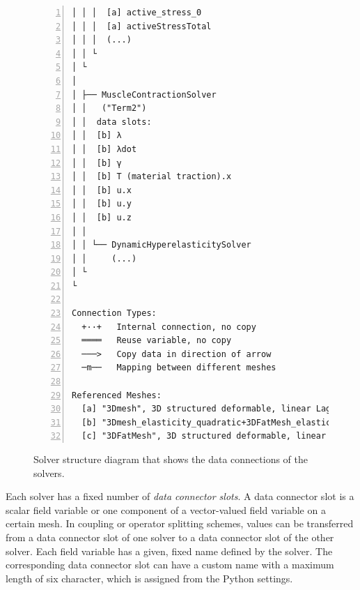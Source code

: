 \begin{figure}
\begin{framed}
\begin{Verbatim}[fontsize=\scriptsize\ttfamily,numbers=left]
│ │ │  [a] active_stress_0                          ├÷÷÷÷÷÷÷÷─ g_mu ¤2<──┘     │ │
│ │ │  [a] activeStressTotal                         ├÷÷÷÷÷÷÷ g_tot ¤3  x      │ │
│ │ │  (...)                                          :::::::                  m │
│ │ └                                                 :::::::                  │ │
│ └                                                   :::::::                  │ │
│                                                     :::::::                  │ │
│ ├── MuscleContractionSolver                         :::::::                  │ │ 
│ │   ("Term2")                                       :::::::                  │ │
│ │  data slots:                                      :::::::                  │ │
│ │  [b] λ                                            ├÷÷÷÷÷÷lambda ¤0<────────┼─┘
│ │  [b] λdot                                          ├÷÷÷÷÷─ ldot ¤1  x      │
│ │  [b] γ                                              ├÷÷÷÷─ g_in ¤2<────────┘
│ │  [b] T (material traction).x                         ├÷÷÷──── T ¤3  x
│ │  [b] u.x                                              ├÷÷────── ¤4  x
│ │  [b] u.y                                               ├÷────── ¤5  x
│ │  [b] u.z                                                ├────── ¤6  x
│ │                                                                     
│ │ └── DynamicHyperelasticitySolver    
│ │     (...)                                
│ └                                                                     
└                                                                       
                                                                        
Connection Types:
  +··+   Internal connection, no copy
  ════   Reuse variable, no copy
  ───>   Copy data in direction of arrow
  ─m──   Mapping between different meshes

Referenced Meshes:
  [a] "3Dmesh", 3D structured deformable, linear Lagrange basis
  [b] "3Dmesh_elasticity_quadratic+3DFatMesh_elasticity_quadratic", 3D quadratic Lagrange basis
  [c] "3DFatMesh", 3D structured deformable, linear Lagrange basis
\end{Verbatim}
\vspace{-5mm}
\end{framed}
\caption{Solver structure diagram that shows the data connections of the solvers.}%
\label{fig:example_multidomain_solver_structure}%
\end{figure}

Each solver has a fixed number of \emph{data connector slots}. A data connector slot is a scalar field variable or one component of a vector-valued field variable on a certain mesh. In coupling or operator splitting schemes, values can be transferred from a data connector slot of one solver to a data connector slot of the other solver. Each field variable has a given, fixed name defined by the solver. The corresponding data connector slot can have a custom name with a maximum length of six character, which is assigned from the Python settings.

